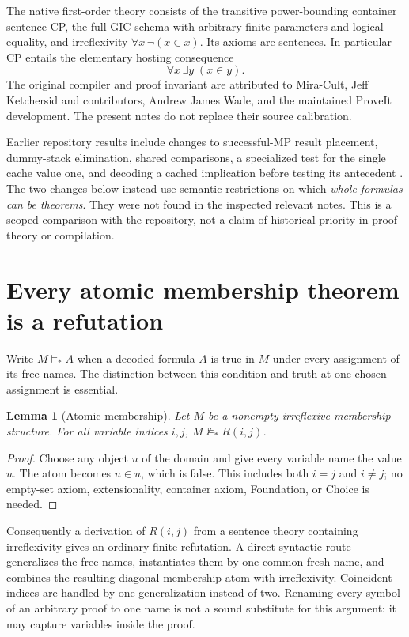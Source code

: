 \documentclass[11pt]{article}
\newtheorem{lemma}[theorem]{Lemma}
\begin{document}
The native first-order theory consists of the transitive power-bounding
container sentence CP, the full GIC schema with arbitrary finite parameters
and logical equality, and irreflexivity
\(\forall x\,\neg(x\in x)\). Its axioms are sentences. In particular CP entails
the elementary hosting consequence
\[
 \forall x\,\exists y\;(x\in y).                    \tag{Host}
\]
The original compiler and proof invariant are attributed to Mira-Cult, Jeff
Ketchersid and contributors, Andrew James Wade, and the maintained ProveIt
development. The present notes do not replace their source calibration.

Earlier repository results include changes to successful-MP result placement,
dummy-stack elimination, shared comparisons, a specialized test for the
single cache value one, and decoding a cached implication before testing its
antecedent \cite{cachemp,dummy,decoded}. The two changes below instead use
semantic restrictions on which \emph{whole formulas can be theorems}. They were
not found in the inspected relevant notes. This is a scoped comparison with the
repository, not a claim of historical priority in proof theory or compilation.

\section{Every atomic membership theorem is a refutation}

Write \(M\models_* A\) when a decoded formula \(A\) is true in \(M\) under every
assignment of its free names. The distinction between this condition and truth
at one chosen assignment is essential.

\begin{lemma}[Atomic membership]
Let \(M\) be a nonempty irreflexive membership structure. For all variable
indices \(i,j\), \(M\not\models_* R(i,j)\).
\end{lemma}
\begin{proof}
Choose any object \(u\) of the domain and give every variable name the value
\(u\). The atom becomes \(u\in u\), which is false. This includes both
\(i=j\) and \(i\ne j\); no empty-set axiom, extensionality, container axiom,
Foundation, or Choice is needed.
\end{proof}

Consequently a derivation of \(R(i,j)\) from a sentence theory containing
irreflexivity gives an ordinary finite refutation. A direct syntactic route
generalizes the free names, instantiates them by one common fresh name, and
combines the resulting diagonal membership atom with irreflexivity. Coincident
indices are handled by one generalization instead of two. Renaming every symbol
of an arbitrary proof to one name is not a sound substitute for this argument:
it may capture variables inside the proof.
\end{document}
